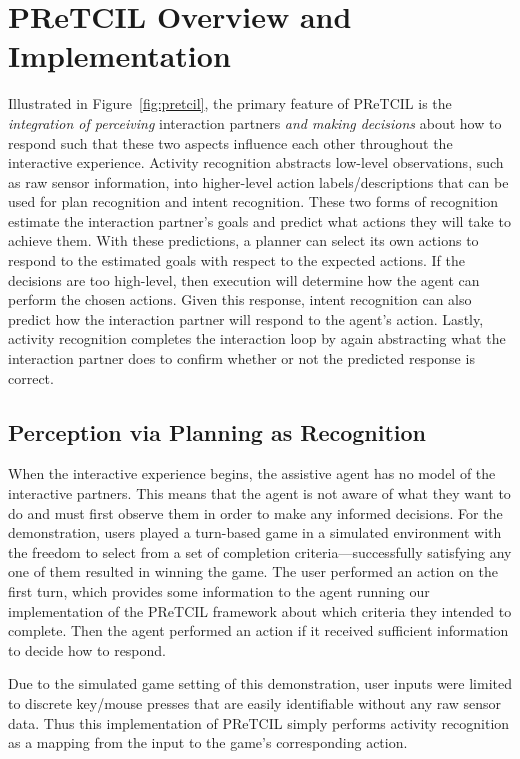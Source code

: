 \documentclass[letterpaper]{article} %
\begin{document}
\section{{\sc PReTCIL} Overview and Implementation\label{sec:pretcil}}
Illustrated in Figure~\ref{fig:pretcil}, the primary feature of {\sc PReTCIL} is the \textit{integration of perceiving} interaction partners \textit{and making decisions} about how to respond such that these two aspects influence each other throughout the interactive experience.  Activity recognition abstracts low-level observations, such as raw sensor information, into higher-level action labels/descriptions that can be used for plan recognition and intent recognition.  These two forms of recognition estimate the interaction partner's goals and predict what actions they will take to achieve them.  With these predictions, a planner can select its own actions to respond to the estimated goals with respect to the expected actions.  If the decisions are too high-level, then execution will determine how the agent can perform the chosen actions.  Given this response, intent recognition can also predict how the interaction partner will respond to the agent's action.  Lastly, activity recognition completes the interaction loop by again abstracting what the interaction partner does to confirm whether or not the predicted response is correct.

\subsection{Perception via Planning as Recognition\label{sec:pretcil.perception}}
When the interactive experience begins, the assistive agent has no model of the interactive partners.  This means that the agent is not aware of what they want to do and must first observe them in order to make any informed decisions.  For the demonstration, users played a turn-based game in a simulated environment with the freedom to select from a set of completion criteria---successfully satisfying any one of them resulted in winning the game.  The user performed an action on the first turn, which provides some information to the agent running our implementation of the {\sc PReTCIL} framework about which criteria they intended to complete.  Then the agent performed an action if it received sufficient information to decide how to respond. %

Due to the simulated game setting of this demonstration, user inputs were limited to discrete key/mouse %
 presses that are easily identifiable without any raw sensor data.  Thus this implementation of {\sc PReTCIL}
 simply performs activity recognition as a mapping from the input to the game's corresponding action.
\end{document}
